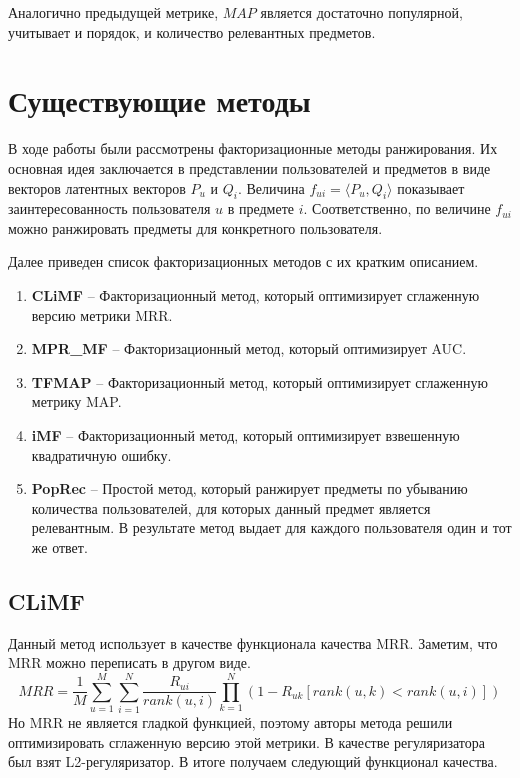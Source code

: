 \documentclass[a4paper,12pt]{article}
\begin{document}
	Аналогично предыдущей метрике, $MAP$ является достаточно популярной, учитывает и порядок, и количество релевантных предметов.
	
	

\section{Существующие методы}
В ходе работы были рассмотрены факторизационные методы ранжирования. Их основная идея заключается в представлении пользователей и предметов в виде векторов латентных векторов $P_u$ и $Q_i$. Величина $f_{ui} = \langle P_u, Q_i\rangle$  показывает заинтересованность пользователя $u$ в предмете  $i$. Соответственно, по величине $f_{ui}$ можно ранжировать предметы для конкретного пользователя.
	
Далее приведен список факторизационных методов с их кратким описанием.  
\begin{enumerate}
\item \textbf{CLiMF} --
  Факторизационный метод, который оптимизирует сглаженную версию метрики MRR.\cite{climf}
  	
\item \textbf{MPR\_MF} -- 
  Факторизационный метод, который оптимизирует AUC.\cite{bprmp}
  
\item \textbf{TFMAP} --
   Факторизационный метод, который оптимизирует сглаженную метрику MAP.\cite{tfmap}

\item \textbf{iMF} --
	Факторизационный метод, который оптимизирует взвешенную квадратичную ошибку.\cite{imf} 

\item \textbf{PopRec} --
    Простой метод, который ранжирует предметы по убыванию количества пользователей, для которых данный предмет является релевантным. В результате метод выдает для каждого пользователя один  и тот же ответ.
\end{enumerate}

\subsection{CLiMF}
Данный метод использует в качестве функционала качества MRR. Заметим, что MRR можно переписать в другом виде.
\begin{equation*}
 MRR =\frac{1}{M}\sum_{u=1}^M \sum_{i=1}^N \frac{R_{ui}}{rank(u,i)}\prod_{k=1}^N(1 - R_{uk}[rank(u,k) < rank(u, i)])
\end{equation*}
 Но  MRR не является гладкой функцией, поэтому авторы метода решили оптимизировать сглаженную версию этой метрики. В качестве регуляризатора был взят L2-регуляризатор. В итоге получаем следующий функционал качества.
\end{document}
